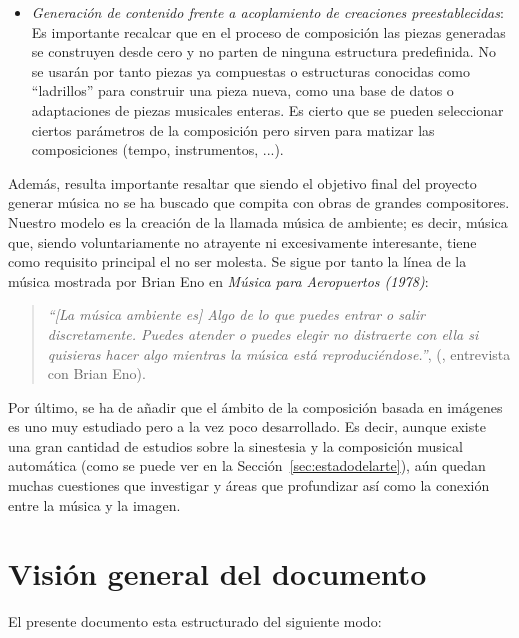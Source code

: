 \begin{itemize}
		\item \emph{Generación de contenido frente a acoplamiento de creaciones preestablecidas}:
			\vspace{0.1in}
			\\Es importante recalcar que en el proceso de composición las piezas generadas se construyen desde cero y no parten de ninguna estructura predefinida. No se usarán por tanto piezas ya compuestas o estructuras conocidas como ``ladrillos'' para construir una pieza nueva, como una base de datos o adaptaciones de piezas musicales enteras. Es cierto que se pueden seleccionar ciertos parámetros de la composición pero sirven para matizar las composiciones (tempo, instrumentos, ...).
		\end{itemize}
		
		Además, resulta importante resaltar que siendo el objetivo final del proyecto generar música no se ha buscado que compita con obras de grandes compositores. Nuestro modelo es la creación de la llamada música de ambiente; es decir, música que, siendo voluntariamente no atrayente ni excesivamente interesante, tiene como requisito principal el no ser molesta. Se sigue por tanto la línea de la música mostrada por Brian Eno en \emph{Música para Aeropuertos (1978)}:
		
		\begin{quote}
		\emph{``[La música ambiente es] Algo de lo que puedes entrar o salir discretamente. Puedes atender o puedes elegir no distraerte con ella si quisieras hacer algo mientras la música está reproduciéndose.''}, (\cite{BrianEnoInterview}, entrevista con Brian Eno).
		\end{quote}		
		
		Por último, se ha de añadir que el ámbito de la composición basada en imágenes es uno muy estudiado pero a la vez poco desarrollado. Es decir, aunque existe una gran cantidad de estudios sobre la sinestesia y la composición musical automática (como se puede ver en la Sección~\ref{sec:estadodelarte}), aún quedan muchas cuestiones que investigar y áreas que profundizar así como la conexión entre la música y la imagen.\\




\section{Visión general del documento}

El presente documento esta estructurado del siguiente modo:\\

